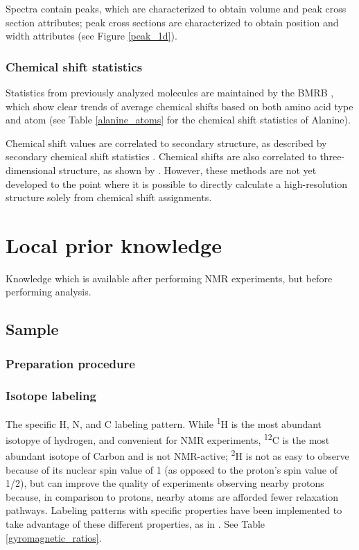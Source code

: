 Spectra contain peaks, which are characterized to obtain volume and peak
cross section attributes; peak cross sections are characterized to obtain 
position and width attributes (see Figure \ref{peak_1d}).

\subsubsection{Chemical shift statistics}
Statistics from previously analyzed molecules are maintained by the BMRB
\cite{bmrb}, which show clear trends of average chemical shifts based on
both amino acid type and atom (see Table \ref{alanine_atoms} for the 
chemical shift statistics of Alanine).

Chemical shift values are correlated to secondary structure, as described
by secondary chemical shift statistics \cite{spera1991empirical}.  Chemical 
shifts are also correlated to three-dimensional structure, as shown by 
\cite{cheshire}.  However, these methods are not yet developed to the point
where it is possible to directly calculate a high-resolution structure
solely from chemical shift assignments.


\section{Local prior knowledge}
Knowledge which is available after performing NMR experiments, but before
performing analysis.

\subsection{Sample}

\subsubsection{Preparation procedure}

\subsubsection{Isotope labeling}
The specific H, N, and C labeling pattern.  While \textsuperscript{1}H is 
the most abundant isotopye of hydrogen, and convenient for NMR experiments,
\textsuperscript{12}C is the most abundant isotope of Carbon and is not 
NMR-active; \textsuperscript{2}H is not as easy to observe because of
its nuclear spin value of 1 (as opposed to the proton's spin value of 1/2),
but can improve the quality of experiments observing nearby protons because,
in comparison to protons, nearby atoms are afforded fewer relaxation pathways.
Labeling patterns with specific properties have been implemented to take
advantage of these different properties, as in \cite{sail_flya}.
See Table \ref{gyromagnetic_ratios}.

